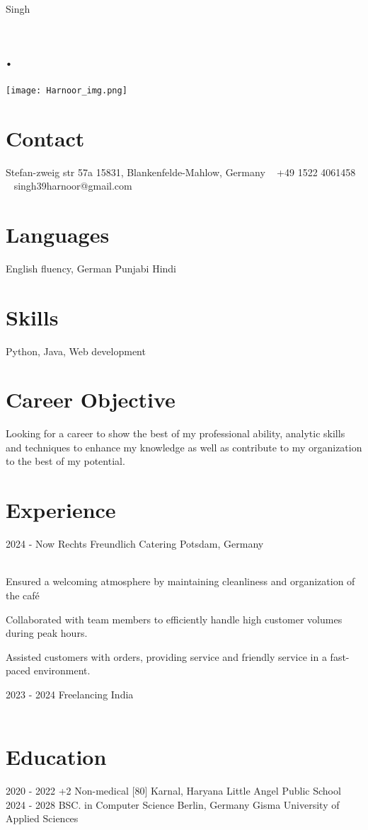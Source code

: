 \documentclass[]{cv-style} %
\begin{document}
 { Singh}
\begin{aside}
\section{.}
\texttt{[image: Harnoor\_img.png]}
\section{Contact}
Stefan-zweig str 57a
15831, Blankenfelde-Mahlow,
Germany
~
+49 1522 4061458
~
singh39harnoor@gmail.com
\section{Languages}
English fluency,
German
Punjabi
Hindi
\section{Skills}
Python, 
Java,
Web development

\end{aside}
\section{Career Objective}
  \vspace{-0.2cm}
Looking for a career to show the best of my professional ability, analytic skills and techniques to enhance my knowledge as well as contribute to my organization to the best of my potential.
\section{Experience}
\begin{entrylist}
\entry
  {2024 - Now}
  {Rechts Freundlich Catering}
  {Potsdam, Germany}
  {\\
Ensured a welcoming atmosphere by maintaining cleanliness and organization of the café

Collaborated with team members to efficiently handle high customer volumes during peak hours. 

Assisted customers with orders, providing service and friendly service in a fast-paced 
environment.}
\entry
  {2023 - 2024}
  {Freelancing}
  {India}
  {\\
\\}
\end{entrylist}
\section{Education}
\begin{entrylist}
\entry
{2020 - 2022}
{+2 {\normalfont Non-medical [80]}}
{Karnal, Haryana}
{Little Angel Public School}
\entry
{2024 - 2028}
{BSC. {\normalfont in Computer Science }}
{Berlin, Germany}
{Gisma University of Applied Sciences}

\end{entrylist} 
\end{document}
